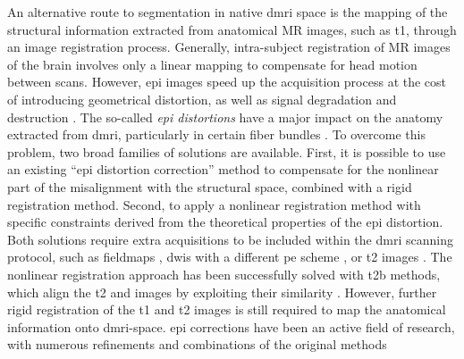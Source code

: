 An alternative route to segmentation in native \gls*{dmri} space is the mapping of the
  structural information extracted from anatomical MR images, such as \gls*{t1}, through
  an image registration process.
Generally, intra-subject registration of MR images of the brain involves only a linear
  mapping to compensate for head motion between scans.
However, \gls*{epi} images speed up the acquisition process at the cost of introducing geometrical
  distortion, as well as signal degradation and destruction \citep{jezzard_correction_1995}.
The so-called \emph{\gls*{epi} distortions} have a major impact on the anatomy extracted
  from \gls*{dmri}, particularly in certain fiber bundles \citep{irfanoglu_effects_2012}.
To overcome this problem, two broad families of solutions are available.
First, it is possible to use an existing ``\gls*{epi} distortion correction''
  method to compensate for the nonlinear part of the misalignment with the structural space,
  combined with a rigid registration method.
Second, to apply a nonlinear registration method with specific constraints derived from the
  theoretical properties of the \gls*{epi} distortion.
Both solutions require extra acquisitions to be included within the \gls*{dmri} scanning
  protocol, such as fieldmaps \citep{jezzard_correction_1995}, \glspl*{dwi} with a different
  \gls*{pe} scheme \citep{cordes_geometric_2000,chiou_simple_2000}, or \gls*{t2} images
  \citep{kybic_unwarping_2000}.
The nonlinear registration approach has been successfully solved with \gls*{t2b} methods,
  which align the \gls*{t2} and \lowb{} images by exploiting their similarity
  \citep{kybic_unwarping_2000,studholme_accurate_2000}.
However, further rigid registration of the \gls*{t1} and \gls*{t2} images is still required to
  map the anatomical information onto \gls*{dmri}-space.
\Gls*{epi} corrections have been an active field of research, with numerous refinements and
  combinations of the original methods \citep{holland_efficient_2010,andersson_comprehensive_2012,
  irfanoglu_drbuddi_2015}

